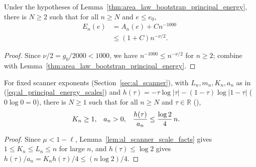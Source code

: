 \begin{corollary}
    \label{cor:area_law_bootstrap_energy_expression}
    \leanok
    Under the hypotheses of Lemma~\ref{thm:area_law_bootstrap_principal_energy},
    there is $N\ge2$ such that for all $n\ge N$ and $e\le e_0$,
    \begin{align}
        E_n(e) & =A_n(e)+Cn^{-1000}
        \label{eq:al_bootstrap_energy_expression} \\
               & \le(1+C)n^{-\nu/2}.
        \label{eq:al_bootstrap_energy_expression_bound}
    \end{align}
\end{corollary}
\begin{proof}\leanok
    Since $\nu/2=g_0/2000<1000$, we have $n^{-1000}\le n^{-\nu/2}$ for $n\ge2$;
    combine with Lemma~\ref{thm:area_law_bootstrap_principal_energy}.
\end{proof}

\begin{lemma}
    \label{thm:area_law_bootstrap_binary_entropy_cost}
    \leanok
    For fixed scanner exponents (Section~\ref{sec:al_scanner}), with $L_n,m_n,K_n,a_n$
    as in (\ref{eq:al_principal_energy_scales}) and
    $h(\tau)=-\tau\log|\tau|-(1-\tau)\log|1-\tau|$ ($0\log0=0$), there is
    $N\ge1$ such that for all $n\ge N$ and $\tau\in\mathbb R$
    (\cite[Proposition~9.5]{OpenAI2026AreaLaw}),
    \begin{align}
        K_n                 & \ge1,                         & a_n & >0, &
        \frac{h(\tau)}{a_n} & \le\frac{\log2}{4}\,n. \notag
    \end{align}
\end{lemma}
\begin{proof}\leanok
    Since $\mu<1-\ell$, Lemma~\ref{lem:al_scanner_scale_facts} gives
    $1\le K_n\le L_n\le n$ for large $n$, and $h(\tau)\le\log2$ gives
    $h(\tau)/a_n=K_nh(\tau)/4\le(n\log2)/4$.
\end{proof}

